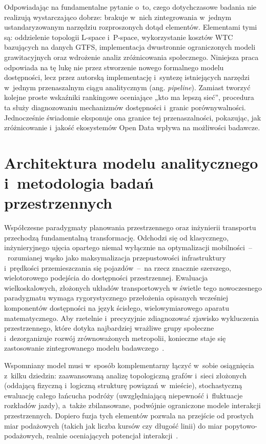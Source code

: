 \documentclass{pracamgr}
\begin{document}
Odpowiadając na fundamentalne pytanie o~to, czego dotychczasowe badania nie realizują wystarczająco dobrze: brakuje w~nich zintegrowania w~jednym ustandaryzowanym narzędziu rozproszonych dotąd elementów. Elementami tymi są: oddzielenie topologii L-space i~P-space, wykorzystanie kosztów WTC bazujących na danych GTFS, implementacja dwustronnie ograniczonych modeli grawitacyjnych oraz wdrożenie analiz zróżnicowania społecznego. Niniejsza praca odpowiada na tę lukę nie przez stworzenie nowego formalnego modelu dostępności, lecz przez autorską implementację i~syntezę istniejących narzędzi w~jednym przenaszalnym ciągu analitycznym (ang. \textit{pipeline}). Zamiast tworzyć kolejne proste wskaźniki rankingowe oceniające „kto ma lepszą sieć”, procedura ta służy diagnozowaniu mechanizmów dostępności i~granic porównywalności. Jednocześnie świadomie eksponuje ona granice tej przenaszalności, pokazując, jak zróżnicowanie i~jakość ekosystemów Open Data wpływa na możliwości badawcze.


\chapter{Architektura modelu analitycznego i~metodologia badań przestrzennych}\label{chapter:metodologia}

Współczesne paradygmaty planowania przestrzennego oraz inżynierii transportu przechodzą fundamentalną transformację. Odchodzi się od klasycznego, inżynieryjnego ujęcia opartego niemal wyłącznie na optymalizacji mobilności~–~rozumianej wąsko jako maksymalizacja przepustowości infrastruktury i~prędkości przemieszczania się pojazdów~–~na rzecz znacznie szerszego, wielotorowego podejścia do dostępności przestrzennej. Ewaluacja wielkoskalowych, złożonych układów transportowych w świetle tego nowoczesnego paradygmatu wymaga rygorystycznego przełożenia opisanych wcześniej komponentów dostępności na język ścisłego, wielowymiarowego aparatu matematycznego. Aby rzetelnie i~precyzyjnie zdiagnozować zjawisko wykluczenia przestrzennego, które dotyka najbardziej wrażliwe grupy społeczne i~dezorganizuje rozwój zrównoważonych metropolii, konieczne staje się zastosowanie zintegrowanego modelu badawczego~\cite{KHALIFE2023160, LUO2019102505}.

Wspomniany model musi w~sposób komplementarny łączyć w~sobie osiągnięcia z~kilku dziedzin: zaawansowaną analizę topologiczną grafów i~sieci złożonych (oddającą fizyczną i~logiczną strukturę powiązań w~mieście), stochastyczną ewaluację całego łańcucha podróży (uwzględniającą niepewność i~fluktuacje rozkładów jazdy), a~także zbilansowane, podwójnie ograniczone modele interakcji przestrzennych. Dopiero fuzja tych elementów pozwala na przejście od prostych miar podażowych (takich jak liczba kursów czy długość linii) do miar popytowo-podażowych, realnie oceniających potencjał interakcji~\cite{LUO2019102505, gravity2, l-space2, mrt}.
\end{document}
